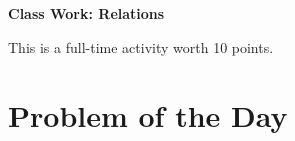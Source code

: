 \documentclass[11pt]{article}
\begin{document}
	
	\thispagestyle{empty}
	\renewcommand{\headrulewidth}{0.0pt}
	\thispagestyle{fancy}
	\lfoot{}
	\cfoot{}
	\rfoot{}	
	
	\vspace*{0in}

		\begin{center}
			\begin{large}
			\textbf{Class Work: Relations} \\
			\end{large}
			This is a full-time activity worth 10 points. 
			
		\end{center}
		

\section*{Problem of the Day}
\end{document}
